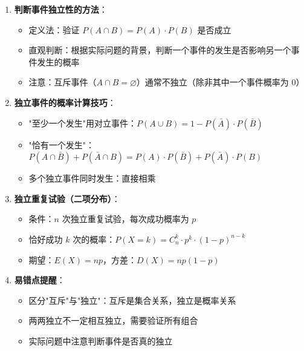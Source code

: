 \documentclass[11pt]{ctexrep}
\begin{document}
\begin{enumerate}
    \item \textbf{判断事件独立性的方法}：
    \begin{itemize}
        \item 定义法：验证 $P(A \cap B) = P(A) \cdot P(B)$ 是否成立
        \item 直观判断：根据实际问题的背景，判断一个事件的发生是否影响另一个事件发生的概率
        \item 注意：互斥事件（$A \cap B = \varnothing$）通常不独立（除非其中一个事件概率为 $0$）
    \end{itemize}
    
    \item \textbf{独立事件的概率计算技巧}：
    \begin{itemize}
        \item "至少一个发生"用对立事件：$P(A \cup B) = 1 - P(\bar{A}) \cdot P(\bar{B})$
        \item "恰有一个发生"：$P(A \cap \bar{B}) + P(\bar{A} \cap B) = P(A) \cdot P(\bar{B}) + P(\bar{A}) \cdot P(B)$
        \item 多个独立事件同时发生：直接相乘
    \end{itemize}
    
    \item \textbf{独立重复试验（二项分布）}：
    \begin{itemize}
        \item 条件：$n$ 次独立重复试验，每次成功概率为 $p$
        \item 恰好成功 $k$ 次的概率：$P(X = k) = C_n^k \cdot p^k \cdot (1-p)^{n-k}$
        \item 期望：$E(X) = np$，方差：$D(X) = np(1-p)$
    \end{itemize}
    
    \item \textbf{易错点提醒}：
    \begin{itemize}
        \item 区分"互斥"与"独立"：互斥是集合关系，独立是概率关系
        \item 两两独立不一定相互独立，需要验证所有组合
        \item 实际问题中注意判断事件是否真的独立
    \end{itemize}
\end{enumerate}
\end{document}
